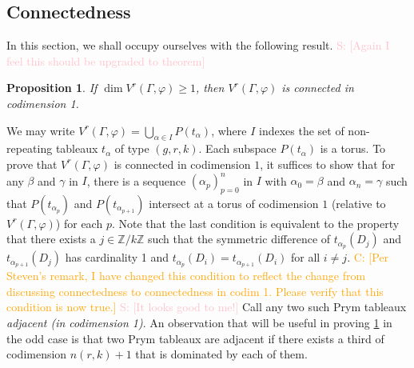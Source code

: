 \documentclass[11pt,reqno]{amsart}
\newcommand*{\Z}{\mathbb{Z}}
\newcommand{\yoav}[1]{{\color{blue} \sf  Yo$\alpha$v: [#1]}}
\newcommand{\caelan}[1]{\textcolor{orange}{\sf C: [#1]}}
\newcommand{\steven}[1]{\textcolor{pink}{\sf S: [#1]}}
\theoremstyle{definition}
\theoremstyle{problem}
\theoremstyle{plain}
\newtheorem{proposition}[definition]{Proposition}
\theoremstyle{remark}
\theoremstyle{theorem}
\numberwithin{equation}{section}
\numberwithin{figure}{section}
\begin{document}
\subsection{Connectedness}

In this section, we shall occupy ourselves with the following result.
\steven{Again I feel this should be upgraded to theorem}
\begin{proposition}\label{thm:path}
  If $\dim V^r(\Gamma,\varphi) \geq 1$, then $V^r(\Gamma,\varphi)$ is
  connected in codimension 1.
\end{proposition}

We may write
$V^r(\Gamma,\varphi) = \bigcup_{\alpha \in I} P(t_\alpha)$, where $I$
indexes the set of non-repeating tableaux $t_{\alpha}$ of type
$(g,r,k)$.  Each subspace $P(t_\alpha)$ is a torus.  To prove that
$V^r(\Gamma,\varphi)$ is connected in codimension $1$, it suffices to
show that for any $\beta$ and $\gamma$ in $I$, there is a sequence
$(\alpha_p)_{p=0}^n$ in $I$ with $\alpha_0 = \beta$ and
$\alpha_n = \gamma$ such that $P(t_{\alpha_p})$ and
$P(t_{\alpha_{p+1}})$ intersect at a torus of codimension $1$
(relative to $V^r(\Gamma,\varphi)$) for each $p$.  Note that the last
condition is equivalent to the property that there exists a
$j \in \Z/k\Z$ such that the symmetric difference of
$t_{\alpha_p}(D_j)$ and $t_{\alpha_{p+1}}(D_j)$ has cardinality 1 and
$t_{\alpha_p}(D_i) = t_{\alpha_{p+1}}(D_i)$ for all $i \neq j$.
\caelan{Per Steven's remark, I have changed this condition to reflect
  the change from discussing connectedness to connectedness in codim
  1.  Please verify that this condition is now true.}
  \steven{It looks good to me!}
Call any two such Prym tableaux \textit{adjacent (in codimension 1)}.
An observation that will be useful in proving \cref{thm:path} in the
odd case is that two Prym tableaux are adjacent if there exists a
third of codimension $n(r,k) + 1$ that is dominated by each of them.
\end{document}
